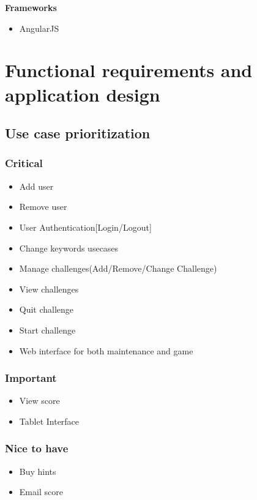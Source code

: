 \documentclass[english]{article}
\begin{document}
			\vspace{0.5cm}
	\textbf{Frameworks} %
	\begin{itemize}
	\item AngularJS	
	\end{itemize}
	
	\newpage
	\section{Functional requirements and application design}
		\subsection{Use case prioritization}
		
		\subsubsection{Critical}
		\begin{itemize}
		
	  	\item Add user
		\item Remove user
		\item User Authentication[Login/Logout]
		\item Change keywords usecases
		\item Manage challenges(Add/Remove/Change Challenge)
		\item View challenges
		\item Quit challenge
		\item Start challenge
		\item Web interface for both maintenance and game 
	   \end{itemize} 
		
		\subsubsection{Important}
		\begin{itemize}
		
	  	\item View score
	  	\item Tablet Interface 
		
	   \end{itemize} 
	   
	   \subsubsection{Nice to have}
		\begin{itemize}
		
	  	\item Buy hints
		\item Email score
	   \end{itemize} 
			
\end{document}
